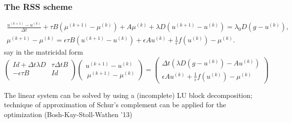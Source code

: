 \documentclass[hyperref={pdfpagemode=FullScreen},9pt]{beamer}
\newcommand{\Frac}[2] {\frac{\textstyle #1} {\textstyle #2}}
\begin{document}
\begin{frame}
\frametitle{The RSS scheme}
\begin{eqnarray}
\label{RSS_CH2}
\Frac{u^{(k+1)}-u^{(k)}}{\Delta t}+\tau B(\mu^{(k+1)}-\mu^{(k)}) +A\mu^{(k)} +\lambda D(u^{(k+1)}-u^{(k)})=
\lambda_0D(g-u^{(k)}),\\
\label{RSS_CH2}
\mu^{(k+1)}-\mu^{(k)}=\epsilon \tau B (u^{(k+1)}-u^{(k)})+\epsilon Au^{(k)}+\Frac{1}{\epsilon} f(u^{(k)})-\mu^{(k)}.
\end{eqnarray}
say in the matricidal form
$$
\left(
\begin{array}{ll}
Id +\Delta t \lambda D& \tau \Delta t B\\
-\epsilon \tau B & Id\\
\end{array}
\right)
\left(
\begin{array}{l}
u^{(k+1)}-u^{(k)}\\\
\mu^{(k+1)}-\mu^{(k)}
\end{array}
\right)
=
\left(
\begin{array}{l}
\Delta t  (\lambda D(g-u^{(k)})-Au^{(k)})\\
\epsilon A u^{(k)}+\Frac{1}{\epsilon}f(u^{(k)})-\mu^{(k)}
\end{array}
\right)
$$

The linear system can be solved by using a (incomplete) LU block decomposition; technique of approximation of Schur's complement can be applied for the optimization (Bosh-Kay-Stoll-Wathen '13)
\end{frame}
\end{document}
